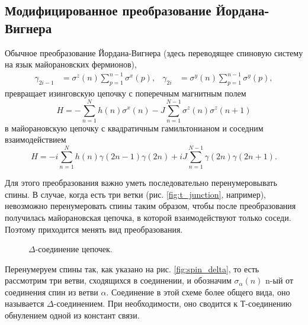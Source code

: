 \documentclass[a4paper,12pt]{article}
\theoremstyle{plain} %
\theoremstyle{definition} %
\theoremstyle{remark} %
\begin{document}
\subsection{Модифицированное преобразование Йордана-Вигнера}

Обычное преобразование Йордана-Вигнера (здесь переводящее спиновую систему на язык майорановских фермионов),
\begin{align}
\gamma_{2i-1} &= \sigma^z (n) \sum\limits_{p=1}^{n-1} \sigma^x (p), & 
\gamma_{2i} &= \sigma^y (n) \sum\limits_{p=1}^{n-1} \sigma^y (p),
\end{align}
превращает изинговскую цепочку с поперечным магнитным полем
\begin{equation}
H = - \sum\limits_{n=1}^N h(n) \sigma^x(n) - J \sum\limits_{n=1}^{N-1} \sigma^z(n) \sigma^z(n+1)
\end{equation}
в майорановскую цепочку с квадратичным гамильтонианом и соседним взаимодействием
\begin{equation}
H = -i \sum\limits_{n=1}^N h(n) \gamma(2n-1) \gamma(2n) + i J \sum\limits_{n=1}^{N-1} \gamma(2n) \gamma(2n+1).
\end{equation}

Для этого преобразования важно уметь последовательно перенумеровывать спины. В случае, когда есть три ветки (рис. \ref{fig:t_junction}, например), невозможно перенумеровать спины таким образом, чтобы после преобразования получилась майорановская цепочка, в которой взаимодействуют только соседи. Поэтому приходится менять вид преобразования.

\begin{figure}
    \centering
    \captionsetup{width=0.45\textwidth}
    \caption{$\Delta$-соединение цепочек.}
\end{figure}

Перенумеруем спины так, как указано на рис. \ref{fig:spin_delta}, то есть рассмотрим три ветви, сходящихся в соединении, и обозначим $\sigma_\alpha (n)$ n-ый от соединения спин из ветви $\alpha$. Соединение в этой схеме более общего вида, оно называется $\Delta$-соединением. При необходимости, оно сводится к Т-соединению обнулением одной из констант связи.
\end{document}
